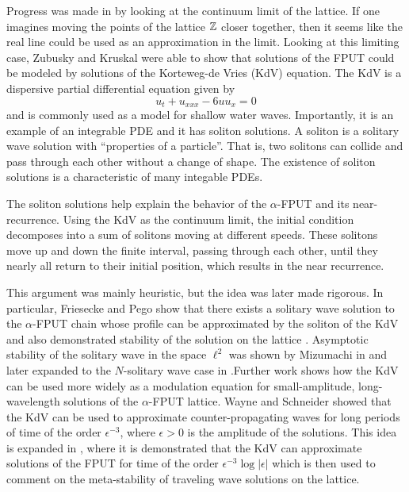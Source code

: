 Progress was made in  \cite{zabusky1965interaction} by looking at the continuum limit of the lattice. If one imagines moving the points of the lattice \(\mathbb{Z}\) closer together, then it seems like the real line could be used as an approximation in the limit. Looking at this limiting case, Zubusky and Kruskal were able to show that solutions of the FPUT could be modeled by solutions of the Korteweg-de Vries (KdV) equation. The KdV is a dispersive partial differential equation given by 
\begin{equation}
	u_t + u_{xxx} - 6 u u_x = 0
\end{equation}
and is commonly used as a model for shallow water waves. Importantly, it is an example of an integrable PDE and it has soliton solutions. A soliton is a solitary wave solution with ``properties of a particle''. That is, two solitons can collide and pass through each other without a change of shape. The existence of soliton solutions is a characteristic of many integable PDEs.

The soliton solutions help explain the behavior of the \(\alpha\)-FPUT and its near-recurrence. Using the KdV as the continuum limit, the initial condition decomposes into a sum of solitons moving at different speeds. These solitons move up and down the finite interval, passing through each other, until they nearly all return to their initial position, which results in the near recurrence. 

This argument was mainly heuristic, but the idea was later made rigorous. In particular, Friesecke and Pego show that there exists a solitary wave solution to the \(\alpha\)-FPUT chain whose profile can be approximated by the soliton of the KdV and also demonstrated stability of the solution on the lattice \cite{friesecke1999solitary,friesecke2002solitary,friesecke2003solitary,friesecke2004solitary}. Asymptotic stability of the solitary wave in the space \(\ell^2\) was shown by Mizumachi in \cite{mizumachi2009asymptotic} and later expanded to the \(N\)-solitary wave case in \cite{mizumachi2013asymptotic}.Further work shows how the KdV can be used more widely as a modulation equation for small-amplitude, long-wavelength solutions of the \(\alpha\)-FPUT lattice. Wayne and Schneider showed that the KdV can be used to approximate counter-propagating waves for long periods of time \cite{schneider2000counter} of the order \(\epsilon^{-3}\), where \(\epsilon > 0\) is the amplitude of the solutions. This idea is expanded in \cite{khan2017long}, where it is demonstrated that the KdV can approximate solutions of the FPUT for time of the order \(\epsilon^{-3}\log |\epsilon|\) which is then used to comment on the meta-stability of traveling wave solutions on the lattice. 

